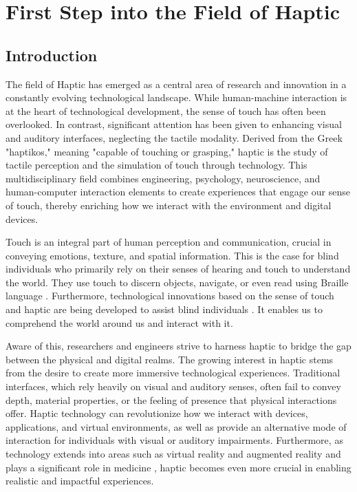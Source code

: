 \chapter{First Step into the Field of Haptic}
\section{Introduction}
The field of Haptic has emerged as a central area of research and innovation in a constantly evolving technological landscape. While human-machine interaction is at the heart of technological development, the sense of touch has often been overlooked. In contrast, significant attention has been given to enhancing visual and auditory interfaces, neglecting the tactile modality. Derived from the Greek "haptikos," meaning "capable of touching or grasping," haptic is the study of tactile perception and the simulation of touch through technology. This multidisciplinary field combines engineering, psychology, neuroscience, and human-computer interaction elements to create experiences that engage our sense of touch, thereby enriching how we interact with the environment and digital devices.

	

Touch is an integral part of human perception and communication, crucial in conveying emotions, texture, and spatial information. This is the case for blind individuals who primarily rely on their senses of hearing and touch to understand the world. They use touch to discern objects, navigate, or even read using Braille language \cite{jimenez_biography_2009}. Furthermore, technological innovations based on the sense of touch and haptic are being developed to assist blind individuals \cite{ramstein_combining_1996}\cite{noauthor_brailleband_nodate}. It enables us to comprehend the world around us and interact with it.

Aware of this, researchers and engineers strive to harness haptic to bridge the gap between the physical and digital realms.
The growing interest in haptic stems from the desire to create more immersive technological experiences. Traditional interfaces, which rely heavily on visual and auditory senses, often fail to convey depth, material properties, or the feeling of presence that physical interactions offer. Haptic technology can revolutionize how we interact with devices, applications, and virtual environments, as well as provide an alternative mode of interaction for individuals with visual or auditory impairments. Furthermore, as technology extends into areas such as virtual reality and augmented reality and plays a significant role in medicine \cite{escobar-castillejos_review_2016}, haptic becomes even more crucial in enabling realistic and impactful experiences.

